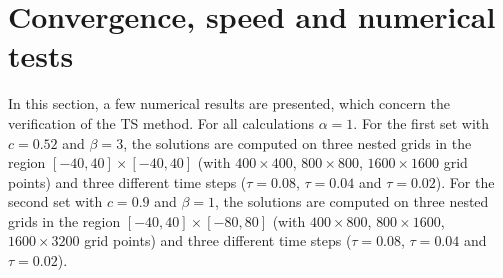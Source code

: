 \documentclass[11pt,a4paper,twoside]{article}
\begin{document}
\section{Convergence, speed and numerical tests}\label{NumTests}
In this section, a few numerical results are presented, which concern the verification of the TS method. 
For all calculations $\alpha = 1$. For the first set with $c=0.52$ and $\beta = 3$, the solutions are computed on three nested grids in the region $[-40, 40] \times [-40, 40]$ (with $400 \times 400$,  $800 \times 800$, $1600 \times 1600$  grid points) and three different time steps ($\tau = 0.08$, $\tau = 0.04$ and $\tau = 0.02$). For the second set with $c=0.9$ and $\beta = 1$, the solutions are computed on three nested grids in the region $[-40, 40] \times [-80, 80]$ (with $400 \times 800$,  $800 \times 1600$, $1600 \times 3200$  grid points) and three different time steps ($\tau = 0.08$, $\tau = 0.04$ and $\tau = 0.02$).
\end{document}
